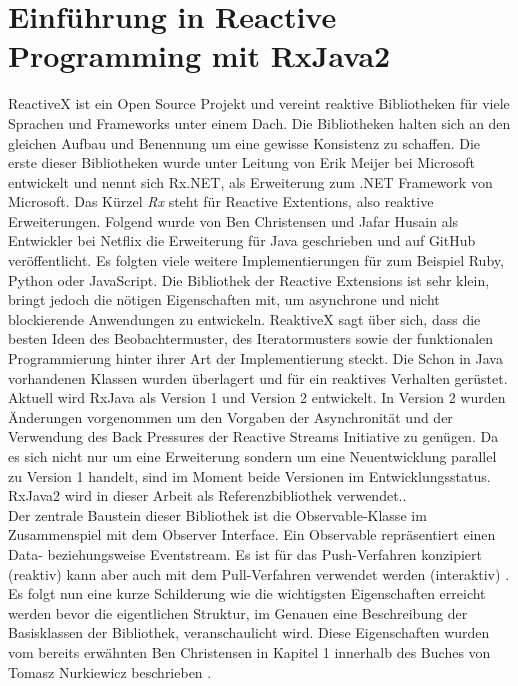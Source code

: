 \chapter{Einführung in Reactive Programming mit RxJava2}\label{rp_einfuehrung}
ReactiveX ist ein Open Source Projekt und vereint reaktive Bibliotheken für viele Sprachen und Frameworks unter einem Dach. Die Bibliotheken halten sich an den gleichen Aufbau und Benennung um eine gewisse Konsistenz zu schaffen. Die erste dieser Bibliotheken wurde unter Leitung von Erik Meijer bei Microsoft entwickelt und nennt sich Rx.NET, als Erweiterung zum .NET Framework von Microsoft. Das Kürzel \textit{Rx} steht für Reactive Extentions, also reaktive Erweiterungen. Folgend wurde von Ben Christensen und Jafar Husain als Entwickler bei Netflix die Erweiterung für Java geschrieben und auf GitHub veröffentlicht. Es folgten viele weitere Implementierungen für zum Beispiel Ruby, Python oder JavaScript. Die Bibliothek der Reactive Extensions ist sehr klein, bringt jedoch die nötigen Eigenschaften mit, um asynchrone und nicht blockierende Anwendungen zu entwickeln. ReaktiveX sagt über sich, dass die besten Ideen des Beobachtermuster, des Iteratormusters sowie der funktionalen Programmierung hinter ihrer Art der Implementierung steckt. Die Schon in Java vorhandenen Klassen wurden überlagert und für ein reaktives Verhalten gerüstet. Aktuell wird RxJava als Version 1 und Version 2 entwickelt. In Version 2 wurden Änderungen vorgenommen um den Vorgaben der Asynchronität und der Verwendung des Back Pressures der Reactive Streams Initiative zu genügen. Da es sich nicht nur um eine Erweiterung sondern um eine Neuentwicklung parallel zu Version 1 handelt, sind im Moment beide Versionen im Entwicklungsstatus. RxJava2 wird in dieser Arbeit als Referenzbibliothek verwendet.\cite{rxgit}.\\ Der zentrale Baustein dieser Bibliothek ist die Observable-Klasse im Zusammenspiel mit dem Observer Interface. Ein Observable repräsentiert einen Data- beziehungsweise Eventstream. Es ist für das Push-Verfahren konzipiert (reaktiv) kann aber auch mit dem Pull-Verfahren verwendet werden (interaktiv) \cite{Nurkiewicz.2017}. Es folgt nun eine kurze Schilderung wie die wichtigsten Eigenschaften erreicht werden bevor die eigentlichen Struktur, im Genauen eine Beschreibung der Basisklassen der Bibliothek, veranschaulicht wird. Diese Eigenschaften wurden vom bereits erwähnten Ben Christensen in Kapitel 1 innerhalb des Buches von Tomasz Nurkiewicz beschrieben \cite{Nurkiewicz.2017}. 
